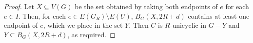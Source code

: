 \documentclass{patmorin}
\newcommand{\pat}[1]{\textcolor{Blue}{Pat: #1}}
\newcommand{\piotr}[1]{\textcolor{red}{Piotr: #1}}
\DeclareMathOperator{\dist}{dist}
\begin{document}
\begin{proof}
  Let $X\subseteq V(G)$ be the set obtained by taking both endpoints of $e$ for each $e\in I$.  Then, for each $e\in E(G_R)\setminus E(U)$, $B_G(X,2R+d)$ contains at least one endpoint of $e$, which we place in the set $Y$.  Then $C$ is $R$-unicyclic in $G-Y$ and $Y\subseteq B_G(X,2R+d)$, as required.
\end{proof}











\end{document}
